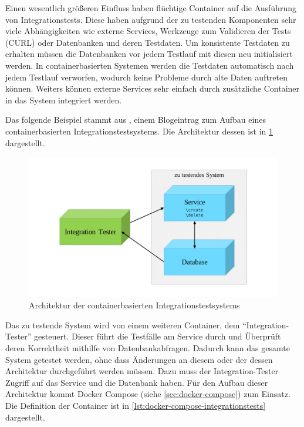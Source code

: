 Einen wesentlich größeren Einfluss haben flüchtige Container auf die Ausführung von Integrationstests.
Diese haben aufgrund der zu testenden Komponenten sehr viele Abhängigkeiten wie externe Services, Werkzeuge zum Validieren der Tests (CURL) oder Datenbanken und deren Testdaten.
Um konsistente Testdaten zu erhalten müssen die Datenbanken vor jedem Testlauf mit diesen neu initialisiert werden.
In containerbasierten Systemen werden die Testdaten automatisch nach jedem Testlauf verworfen, wodurch keine Probleme durch alte Daten auftreten können.
Weiters können externe Services sehr einfach durch zusätzliche Container in das System integriert werden.

Das folgende Beispiel stammt aus \autocite{docker-integration-testing:online}, einem Blogeintrag zum Aufbau eines containerbasierten Integrationstestsystems. Die Architektur dessen ist in \cref{fig:containerbasierte-integrationstests} dargestellt.

\begin{figure}[htbp]
    \centering
    \includegraphics[width=0.7\linewidth,clip,trim=100 30 100 30]{images/containerbasierte-integrationstests}
    \caption{Architektur der containerbasierten Integrationstestsystems}
\label{fig:containerbasierte-integrationstests}
\end{figure}
Das zu testende System wird von einem weiteren Container, dem "`Integration-Tester"' gesteuert.
Dieser führt die Testfälle am Service durch und Überprüft deren Korrektheit mithilfe von Datenbankabfragen.
Dadurch kann das gesamte System getestet werden, ohne dass Änderungen an diesem oder der dessen Architektur durchgeführt werden müssen.
Dazu muss der Integration-Tester Zugriff auf das Service und die Datenbank haben.
Für den Aufbau dieser Architektur kommt Docker Compose (siehe \cref{sec:docker-compose}) zum Einsatz.
Die Definition der Container ist in \cref{lst:docker-compose-integrationstests} dargestellt.


